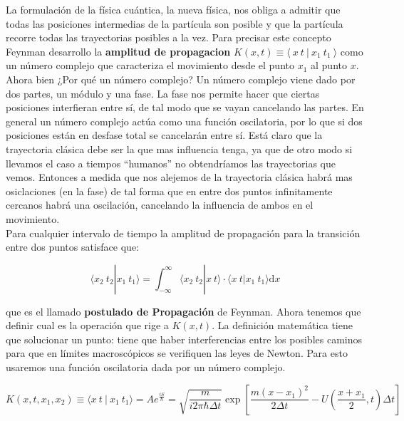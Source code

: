\documentclass[12pt]{article}
\newcommand{\parentesis}[1]{\left( #1  \right)}
\newcommand{\ccorchetes}[1]{\left[ #1  \right]}
\newcommand{\D}{\mathrm{d}}
\begin{document}
La formulación de la física cuántica, la nueva física, nos obliga a admitir que todas las posiciones intermedias de la partícula son posible y que la partícula recorre todas las trayectorias posibles a la vez. Para precisar este concepto Feynman desarrollo la \textbf{amplitud de propagacion} $K(x,t) \equiv \langle \ x \ t \ | \ x_1 \ t_1 \ \rangle$ como un número complejo que caracteriza el movimiento desde el punto $x_1$ al punto $x$. \\

 Ahora bien ¿Por qué un número complejo? Un número complejo viene dado por dos partes, un módulo y una fase. La fase nos permite hacer que ciertas posiciones interfieran entre sí, de tal modo que se vayan cancelando las partes. En general un número complejo actúa como una función oscilatoria, por lo que si dos posiciones están en desfase total se cancelarán entre sí. Está claro que la trayectoria clásica debe ser la que mas influencia tenga, ya que de otro modo si llevamos el caso a tiempos ``humanos'' no obtendríamos las trayectorias que vemos. Entonces a medida que nos alejemos de la trayectoria clásica habrá mas osiclaciones (en la fase) de tal forma que en entre dos puntos infinitamente cercanos habrá una oscilación, cancelando la influencia de ambos en el movimiento. \\
 
Para cualquier intervalo de tiempo la amplitud de propagación para la transición entre dos puntos satisface que: 

\begin{equation}
\langle x_2 \ t_2 | x_1 \ t_1 \rangle = \int_{-\infty}^{\infty} \langle x_2 \  t_2 | x \  t \rangle \cdot \langle x \ t | x_1 \ t_1 \rangle \D x
\label{Ec:3-Postulado-Propagación}
\end{equation}

que es el llamado \textbf{postulado de Propagación} de Feynman. Ahora tenemos que definir cual es la operación que rige a $K(x,t)$. La definición matemática tiene que solucionar un punto: tiene que haber interferencias entre los posibles caminos para que en límites macroscópicos se verifiquen las leyes de Newton. Para esto usaremos una función oscilatoria dada por un número complejo. 

\begin{equation}
K(x,t,x_1,x_2) \equiv \langle x \ t \ | \ x_1 \  t_1 \rangle = A e^{\frac{i S}{\hbar}} = \sqrt{\frac{m}{i 2 \pi \hbar \Delta t}} \exp \ccorchetes{\dfrac{m (x-x_1)^2}{2 \Delta t} - U \parentesis{\frac{x+x_1}{2},t} \Delta t}
\label{Ec:3-Principio-Propagación}
\end{equation}
\end{document}
